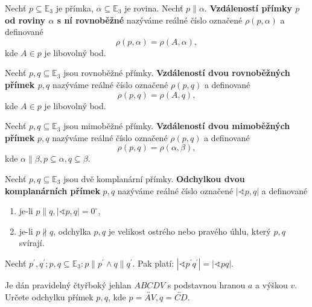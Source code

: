 \begin{definition}
    Nechť $p\subseteq \mathbb E_3$ je přímka, $\alpha \subseteq \mathbb E_3$ je rovina.
    Nechť $p\parallel \alpha.$ \textbf{Vzdáleností přímky $p$ od roviny $\alpha$
    s ní rovnoběžné} nazýváme reálné číslo označené $\rho(p,\alpha)$ a definované
    $$\rho(p,\alpha)=\rho(A,\alpha),$$
    kde $A\in p$ je libovolný bod.
\end{definition}

\begin{definition}
    Nechť $p,q\subseteq \mathbb E_3$ jsou rovnoběžné přímky. \textbf{Vzdáleností
    dvou rovnoběžných přímek $p,q$} nazýváme reálné číslo označené $\rho(p,q)$ a
    definované
    $$\rho(p,q) = \rho(A,q),$$
    kde $A\in p$ je libovolný bod.
\end{definition}

\begin{definition}
    Nechť $p,q\subseteq \mathbb E_3$ jsou mimoběžné přímky. \textbf{Vzdáleností dvou
    mimoběžných přímek} $p,q$ nazýváme reálné číslo označené $\rho(p,q)$ a definované
    $$\rho(p,q)=\rho(\alpha, \beta),$$
    kde $\alpha \parallel \beta, p\subseteq\alpha, q\subseteq \beta.$
\end{definition}

\begin{definition}
    Nechť $p,q\subseteq \mathbb E_3$ jsou dvě komplanární přímky. \textbf{Odchylkou
    dvou komplanárních přímek} $p,q$ nazýváme reálné číslo označené $|\sphericalangle
    p,q|$ a definované
    \begin{enumerate}[$i.$]
    \item je-li $p\parallel q, |\sphericalangle p,q|=0^\circ,$
   	\item je-li $p\nparallel q$, odchylka $p,q$ je velikost ostrého nebo pravého úhlu,
        který $p,q$ svírají.
    \end{enumerate}
\end{definition}

\begin{veta}
    Nechť $p^\prime, q^\prime; p,q\subseteq \mathbb E_3: p\parallel p^\prime\land
    q\parallel q^\prime.$ Pak platí: $|\sphericalangle p^\prime q^\prime|=|\sphericalangle p q|.$
\end{veta}

\begin{priklad}
Je dán pravidelný čtyřboký jehlan $ABCDV$ s podstavnou hranou $a$ a výškou $v$.
Určete odchylku přímek $p,q$, kde $p=\overleftrightarrow{AV}, q=\overleftrightarrow{CD}.$
\end{priklad}

